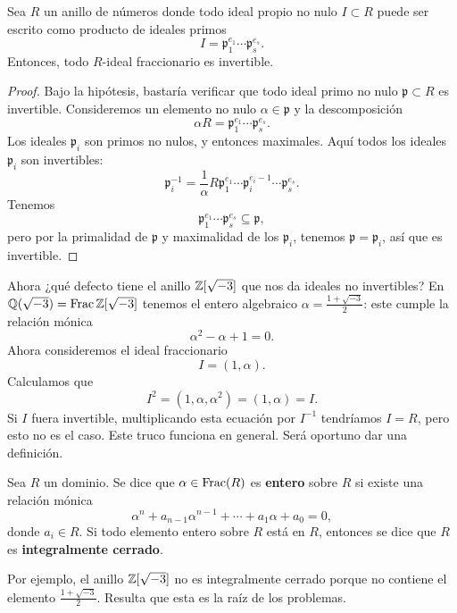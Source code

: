 \begin{proposicion}
  \label{prop:factorizacion-en-primos-invertibilidad}
  Sea $R$ un anillo de números donde todo ideal propio no nulo $I \subset R$
  puede ser escrito como producto de ideales primos
  $$I = \mathfrak{p}_1^{e_1}\cdots \mathfrak{p}_s^{e_s}.$$
  Entonces, todo $R$-ideal fraccionario es invertible.

  \begin{proof}
    Bajo la hipótesis, bastaría verificar que todo ideal primo no nulo
    $\mathfrak{p} \subset R$ es invertible. Consideremos un elemento no
    nulo $\alpha \in \mathfrak{p}$ y la descomposición
    $$\alpha R = \mathfrak{p}_1^{e_1}\cdots\mathfrak{p}_s^{e_s}.$$
    Los ideales $\mathfrak{p}_i$ son primos no nulos, y entonces maximales.
    Aquí todos los ideales $\mathfrak{p}_i$ son invertibles:
    \[ \mathfrak{p}_i^{-1} =
       \frac{1}{\alpha}R \mathfrak{p}_1^{e_1}\cdots
       \mathfrak{p}_i^{e_i - 1}\cdots\mathfrak{p}_s^{e_s}. \]
    Tenemos
    $$\mathfrak{p}_1^{e_1}\cdots\mathfrak{p}_s^{e_s} \subseteq \mathfrak{p},$$
    pero por la primalidad de $\mathfrak{p}$ y maximalidad de los
    $\mathfrak{p}_i$, tenemos $\mathfrak{p} = \mathfrak{p}_i$, así que es
    invertible.
  \end{proof}
\end{proposicion}

Ahora ¿qué defecto tiene el anillo $\mathbb{Z} [\sqrt{-3}]$ que nos da ideales no
invertibles? En $\mathbb{Q} (\sqrt{-3}) = \operatorname{Frac} \mathbb{Z} [\sqrt{-3}]$ tenemos el entero
algebraico $\alpha = \frac{1+\sqrt{-3}}{2}$: este cumple la relación mónica
$$\alpha^2 - \alpha + 1 = 0.$$
Ahora consideremos el ideal fraccionario
$$I = (1, \alpha).$$
Calculamos que
$$I^2 = (1, \alpha, \alpha^2) = (1, \alpha) = I.$$
Si $I$ fuera invertible, multiplicando esta ecuación por $I^{-1}$ tendríamos
$I = R$, pero esto no es el caso. Este truco funciona en general. Será oportuno
dar una definición.

\begin{definicion}
  Sea $R$ un dominio. Se dice que $\alpha \in \operatorname{Frac} (R)$
  es \textbf{entero} sobre $R$ si existe una relación mónica
  $$\alpha^n + a_{n-1} \alpha^{n-1} + \cdots + a_1 \alpha + a_0 = 0,$$
  donde $a_i \in R$. Si todo elemento entero sobre $R$ está en $R$,
  entonces se dice que $R$ es \textbf{integralmente cerrado}.
\end{definicion}

Por ejemplo, el anillo $\mathbb{Z} [\sqrt{-3}]$ no es integralmente cerrado porque no
contiene el elemento $\frac{1+\sqrt{-3}}{2}$. Resulta que esta es la raíz de los
problemas.

